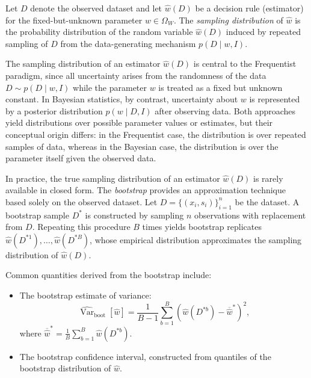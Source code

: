 \begin{definition}
	Let $D$ denote the observed dataset and let $\hat{w}(D)$ be a decision rule (estimator) for the fixed-but-unknown parameter $w\in\Omega_W$. The \emph{sampling distribution} of $\hat{w}$ is the probability distribution of the random variable $\hat{w}(D)$ induced by repeated sampling of $D$ from the data-generating mechanism $p(D \mid w,I)$.	
\end{definition}

\begin{remark}
	The sampling distribution of an estimator $\hat{w}(D)$ is central to the Frequentist paradigm, since all uncertainty arises from the randomness of the data $D \sim p(D \mid w,I)$ while the parameter $w$ is treated as a fixed but unknown constant. In Bayesian statistics, by contrast, uncertainty about $w$ is represented by a posterior distribution $p(w \mid D, I)$ after observing data. Both approaches yield distributions over possible parameter values or estimates, but their conceptual origin differs: in the Frequentist case, the distribution is over repeated samples of data, whereas in the Bayesian case, the distribution is over the parameter itself given the observed data.
\end{remark}

\begin{example}
	In practice, the true sampling distribution of an estimator $\hat{w}(D)$ is rarely available in closed form. The \emph{bootstrap} provides an approximation technique based solely on the observed dataset. Let $D = \{(x_i,s_i)\}_{i=1}^n$ be the dataset. A bootstrap sample $D^{*}$ is constructed by sampling $n$ observations with replacement from $D$. Repeating this procedure $B$ times yields bootstrap replicates $\hat{w}(D^{*1}), \ldots, \hat{w}(D^{*B})$, whose empirical distribution approximates the sampling distribution of $\hat{w}(D)$. 
	
	Common quantities derived from the bootstrap include:
	\begin{itemize}
		\item The bootstrap estimate of variance:
		\begin{equation}
			\widehat{\operatorname{Var}}_{\mathrm{boot}}[\hat{w}] = \frac{1}{B-1}\sum_{b=1}^B \left(\hat{w}(D^{*b}) - \overline{\hat{w}}^{*}\right)^2,
		\end{equation}
		where $\overline{\hat{w}}^{*} = \frac{1}{B}\sum_{b=1}^B \hat{w}(D^{*b})$.
		\item The bootstrap confidence interval, constructed from quantiles of the bootstrap distribution of $\hat{w}$.
	\end{itemize}
\end{example}


